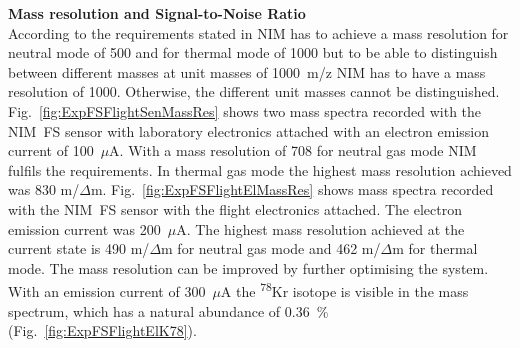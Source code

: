 		\textbf{Mass resolution and Signal-to-Noise Ratio}\\
		According to the requirements stated in \cite{red_book} NIM has to achieve a mass resolution for neutral mode of 500 and for thermal mode of 1000 but to be able to distinguish between different masses at unit masses of 1000~m/z NIM has to have a mass resolution of 1000. Otherwise, the different unit masses cannot be distinguished.\\ %
		Fig.~\ref{fig:ExpFSFlightSenMassRes} shows two mass spectra recorded with the NIM~FS sensor with laboratory electronics attached with an electron emission current of 100~$\mu$A. With a mass resolution of 708 for neutral gas mode NIM fulfils the requirements. In thermal gas mode the highest mass resolution achieved was 830 m/$\Delta$m.
		Fig.~\ref{fig:ExpFSFlightElMassRes} shows mass spectra recorded with the NIM~FS sensor with the flight electronics attached. The electron emission current was 200~$\mu$A. The highest mass resolution achieved at the current state is 490 m/$\Delta$m for neutral gas mode and 462 m/$\Delta$m for thermal mode. The mass resolution can be improved by further optimising the system. With an emission current of 300~$\mu$A the \textsuperscript{78}Kr isotope is visible in the mass spectrum, which has a natural abundance of 0.36~\% (Fig.~\ref{fig:ExpFSFlightElK78}).
		
